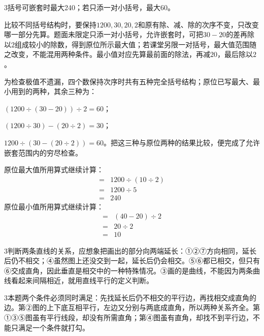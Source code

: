 \documentclass[multi=snippet,border={5bp 20bp 5bp 5bp}]{standalone}
\newenvironment{snippet}[3]{\begin{minipage}{#1bp}\color{answerred}\fontsize{#2}{#3}\selectfont\raggedright}{\end{minipage}}
\begin{document}
\begin{snippet}{505}{11.5}{14}\begin{multicols}{3}\raggedcolumns 括号可嵌套时最大240；若只添一对小括号，最大60。\par 比较不同括号结构时，要保持\(1200,\allowbreak 30,\allowbreak 20,\allowbreak 2\)\allowbreak 和原有除、减、除的次序不变，只改变哪一部分先算。题面未限定只添一对小括号，允许嵌套时，可把\(30-20\)\allowbreak 的差再除以\(2\)\allowbreak 组成较小的除数，得到原位所示最大值；若课堂另限一对括号，最大值范围随之改变，不能混用两种条件。最小值对应先算最前面的除法，再减\(20\)\allowbreak ，最后除以\(2\)\allowbreak 。\par 为检查极值不遗漏，四个数保持次序时共有五种完全括号结构；原位已写最大、最小用到的两种，其余三种为：\par \((1200\div(30-20))\div2=60\)\allowbreak ；\par \((1200\div30)-(20\div2)=30\)\allowbreak ；\par \(1200\div(30-(20\div2))=60\)\allowbreak 。把这三种与原位两种的结果比较，便完成了允许嵌套范围内的穷尽检查。\par 原位最大值所用算式继续计算：\[\begin{aligned}={}&1200\div(10\div2)\\={}&1200\div5\\={}&240\end{aligned}\]原位最小值所用算式继续计算：\[\begin{aligned}={}&(40-20)\div2\\={}&20\div2\\={}&10\end{aligned}\]\end{multicols}\end{snippet}
\begin{snippet}{505}{11.5}{14}\begin{multicols}{3}\raggedcolumns 判断两条直线的关系，应想象把画出的部分向两端延长：①②⑦方向相同，延长后仍不相交；④虽然图上还没交到一起，延长后仍会相交。⑤⑥都已相交，但只有⑥交成直角，因此垂直是相交中的一种特殊情况。③画的是曲线，不能因为两条曲线看起来间隔相近，就用直线平行的定义判断。\end{multicols}\end{snippet}
\begin{snippet}{505}{11.5}{14}\begin{multicols}{3}\raggedcolumns 本题两个条件必须同时满足：先找延长后仍不相交的平行边，再找相交成直角的边。第②图的上下底互相平行，左边又分别与两底成直角，所以两种关系齐全。第①③⑤图虽有平行线段，却没有所需直角；第④图虽有直角，却找不到平行边，不能只满足一个条件就打勾。\end{multicols}\end{snippet}
\end{document}
